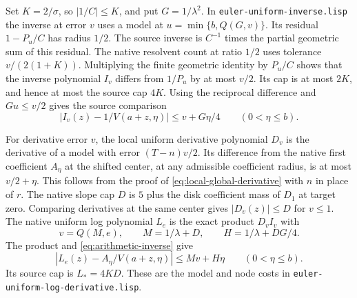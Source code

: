 \documentclass[11pt]{amsart}
\theoremstyle{definition}
\theoremstyle{remark}
\numberwithin{equation}{section}
\newcommand{\code}[1]{\nolinkurl{#1}}
\begin{document}
Set $K=2/\sigma$, so $|1/C|\le K$, and put
$G=1/\lambda^2$. In \code{euler-uniform-inverse.lisp}
the inverse at error $v$ uses a model at
$u=\min\{b,Q(G,v)\}$. Its residual $1-P_u/C$ has radius
$1/2$. The source inverse is $C^{-1}$ times the partial
geometric sum of this residual. The native resolvent
count at ratio $1/2$ uses tolerance $v/(2(1+K))$.
Multiplying the finite geometric identity by $P_u/C$
shows that the inverse polynomial $I_v$ differs from
$1/P_u$ by at most $v/2$. Its cap is at most $2K$,
and hence at most the source cap $4K$.
Using the reciprocal difference and $Gu\le v/2$ gives
the source comparison
\begin{equation}\label{eq:arithmetic-inverse}
   |I_v(z)-1/V(a+z,\eta)|\le v+G\eta/4
                    \qquad(0<\eta\le b).
\end{equation}

For derivative error $v$, the local uniform derivative
polynomial $D_v$ is the derivative of a model with
error $(T-n)v/2$. Its difference from the native
first coefficient $A_\eta$ at the shifted center,
at any admissible coefficient radius, is at most
$v/2+\eta$. This follows from the proof of
\eqref{eq:local-global-derivative} with $n$ in place of
$r$. The native slope cap $D$ is $5$ plus the disk
coefficient mass of $D_1$ at target zero. Comparing
derivatives at the same center gives
$|D_v(z)|\le D$ for $v\le1$.
The native uniform log polynomial $L_e$ is the exact
product $D_v I_v$ with
\[
     v=Q(M,e),\qquad
     M=1/\lambda+D,\qquad H=1/\lambda+DG/4 .
\]
The product and \eqref{eq:arithmetic-inverse} give
\begin{equation}\label{eq:arithmetic-uniform-log}
   |L_e(z)-A_\eta/V(a+z,\eta)|\le Mv+H\eta
                             \qquad(0<\eta\le b).
\end{equation}
Its source cap is $L_*=4KD$.
These are the model and node costs in
\code{euler-uniform-log-derivative.lisp}.
\end{document}
